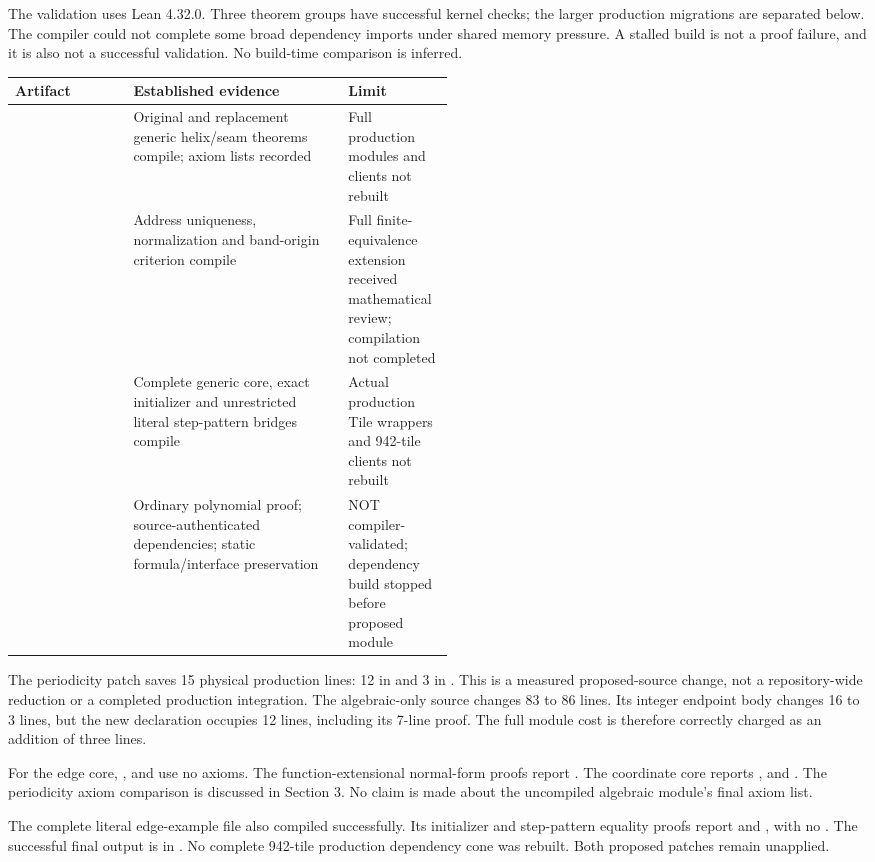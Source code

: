 The validation uses Lean 4.32.0. Three theorem groups have successful kernel checks; the larger production migrations are separated below. The compiler could not complete some broad dependency imports under shared memory pressure. A stalled build is not a proof failure, and it is also not a successful validation. No build-time comparison is inferred.

\begin{center}\small
\begin{tabularx}{\linewidth}{@{}p{0.27\linewidth}Yp{0.24\linewidth}@{}}
\toprule
Artifact & Established evidence & Limit\\\midrule
{} & Original and replacement generic helix/seam theorems compile; axiom lists recorded & Full production modules and clients not rebuilt\\
 & Address uniqueness, normalization and band-origin criterion compile & Full finite-equivalence extension received mathematical review; compilation not completed\\
 & Complete generic core, exact initializer and unrestricted literal step-pattern bridges compile & Actual production Tile wrappers and 942-tile clients not rebuilt\\
 & Ordinary polynomial proof; source-authenticated dependencies; static formula/interface preservation & NOT compiler-validated; dependency build stopped before proposed module\\
\bottomrule
\end{tabularx}
\end{center}

The periodicity patch saves 15 physical production lines: 12 in  and 3 in . This is a measured proposed-source change, not a repository-wide reduction or a completed production integration.
The algebraic-only source changes 83 to 86 lines. Its integer endpoint body changes 16 to 3 lines, but the new  declaration occupies 12 lines, including its 7-line proof. The full module cost is therefore correctly charged as an addition of three lines.

For the edge core, ,  and  use no axioms. The function-extensional normal-form proofs report . The coordinate core reports ,  and . The periodicity axiom comparison is discussed in Section 3. No claim is made about the uncompiled algebraic module's final axiom list.

The complete literal edge-example file also compiled successfully. Its initializer and step-pattern equality proofs report  and , with no . The successful final output is in . No complete 942-tile production dependency cone was rebuilt. Both proposed patches remain unapplied.
